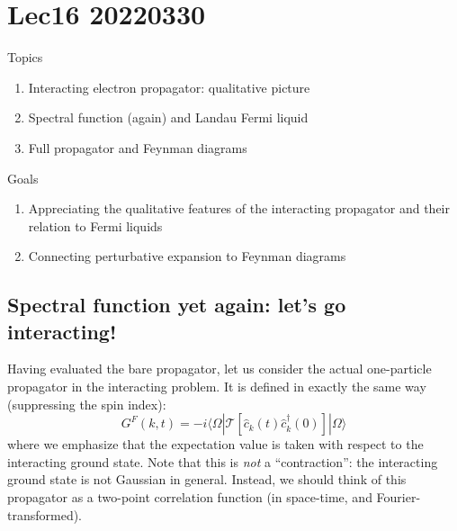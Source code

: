 \chapter{Lec16 20220330}

Topics

\begin{enumerate}
    \item Interacting electron propagator: qualitative picture
    \item Spectral function (again) and Landau Fermi liquid
    \item Full propagator and Feynman diagrams
\end{enumerate}

Goals

\begin{enumerate}
    \item Appreciating the qualitative features of the interacting propagator and their relation to Fermi liquids
    \item Connecting perturbative expansion to Feynman diagrams
\end{enumerate}

\section{Spectral function yet again: let's go interacting!}

Having evaluated the bare propagator, let us consider the actual one-particle propagator in the interacting problem. It is defined in exactly the same way (suppressing the spin index):
\[ G^F\left( k,t \right) =-i\langle \Omega |\mathcal{T} \left[ \hat{c}_k\left( t \right) \hat{c}_{k}^{\dagger}\left( 0 \right) \right] |\Omega \rangle \]
where we emphasize that the expectation value is taken with respect to the interacting ground state. Note that this is \emph{not} a ``contraction'': the interacting ground state is not Gaussian in general. Instead, we should think of this propagator as a two-point correlation function (in space-time, and Fourier-transformed).

